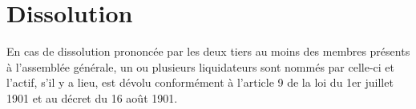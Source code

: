 \documentclass[12pt]{constitution}
\begin{document}
	
	\section{Dissolution}
	En cas de dissolution prononcée par les deux tiers au moins des membres présents à l’assemblée générale, un ou plusieurs liquidateurs sont nommés par celle-ci et l’actif, s’il y a lieu, est dévolu conformément à l’article 9 de la loi du 1er juillet 1901 et au décret du 16 août 1901.
\end{document}
